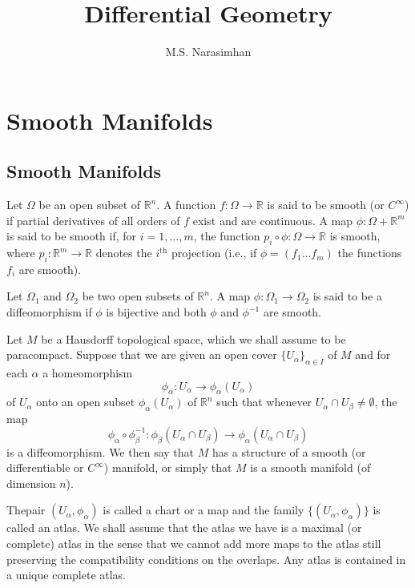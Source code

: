 \title{Differential Geometry}
\author{M.S. Narasimhan}
\date{}

\maketitle

\section{Smooth Manifolds}\label{sec1}

\subsection*{Smooth Manifolds}\pageoriginale

Let $\Omega$ be an open subset of $\mathbb{R}^{n}$. A function $f:\Omega\to \mathbb{R}$ is said to be smooth (or $C^{\infty}$) if partial derivatives of all orders of $f$ exist and are continuous. A map $\phi:\Omega+\mathbb{R}^{m}$ is said to be smooth if, for $i=1,\ldots,m$, the function $p_{i}\circ \phi :\Omega\to \mathbb{R}$ is smooth, where $p_{i}:\mathbb{R}^{m}\to \mathbb{R}$ denotes the $i^{\text{th}}$ projection (i.e., if $\phi=(f_{1}\ldots f_{m})$ the functions $f_{i}$ are smooth).

Let $\Omega_{1}$ and $\Omega_{2}$ be two open subsets of $\mathbb{R}^{n}$. A map $\phi:\Omega_{1}\to \Omega_{2}$ is said to be a diffeomorphism if $\phi$ is bijective and both $\phi$ and $\phi^{-1}$ are smooth.

Let $M$ be a Hausdorff topological space, which we shall assume to be paracompact. Suppose that we are given an open cover $\{U_{\alpha}\}_{\alpha\in I}$ of $M$ and for each $\alpha$ a homeomorphism
$$
\phi_{\alpha}:U_{\alpha}\to \phi_{\alpha}(U_{\alpha})
$$
of $U_{\alpha}$ onto an open subset $\phi_{\alpha}(U_{\alpha})$ of $\mathbb{R}^{n}$ such that whenever $U_{\alpha}\cap U_{\beta}\neq \emptyset$, the map
$$
\phi_{\alpha}\circ \phi^{-1}_{\beta} : \phi_{\beta}\left(U_{\alpha}\cap U_{\beta}\right)\to \phi_{\alpha}\left(U_{\alpha}\cap U_{\beta}\right)
$$
is a diffeomorphism. We then say that $M$ has a structure of a smooth (or differentiable or $C^{\infty}$) manifold, or simply that $M$ is a smooth manifold (of dimension $n$).

The\pageoriginale pair $(U_{\alpha},\phi_{\alpha})$ is called a chart or a map and the family $\{(U_{\alpha},\phi_{\alpha})\}$ is called an atlas. We shall assume that the atlas we have is a maximal (or complete) atlas in the sense that we cannot add more maps to the atlas still preserving the compatibility conditions on the overlaps. Any atlas is contained in a unique complete atlas. 

